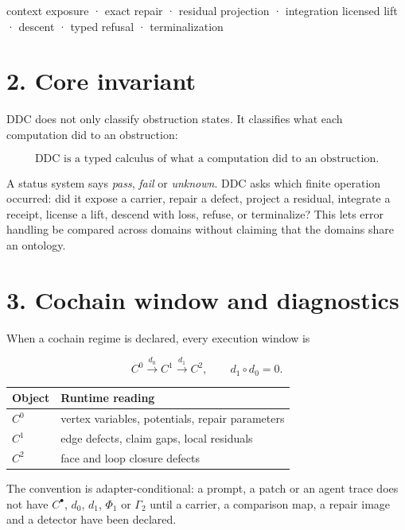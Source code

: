 \documentclass[
  11pt,
]{article}
\newenvironment{Shaded}{}{}
\newcommand{\NormalTok}[1]{#1}
\renewcommand{\_}{\ddcunderscore\allowbreak}
\begin{document}
\begin{Shaded}
\begin{Highlighting}[]
\NormalTok{context exposure · exact repair · residual projection · integration}
\NormalTok{licensed lift · descent · typed refusal · terminalization}
\end{Highlighting}
\end{Shaded}

\section{2. Core invariant}\label{core-invariant}

DDC does not only classify obstruction states. It classifies what each
computation did to an obstruction:

\[\boxed{\text{DDC is a typed calculus of what a computation did to an obstruction.}}\]

A status system says \emph{pass}, \emph{fail} or \emph{unknown}. DDC
asks which finite operation occurred: did it expose a carrier, repair a
defect, project a residual, integrate a receipt, license a lift, descend
with loss, refuse, or terminalize? This lets error handling be compared
across domains without claiming that the domains share an ontology.

\section{3. Cochain window and
diagnostics}\label{cochain-window-and-diagnostics}

When a cochain regime is declared, every execution window is

\[C^0 \xrightarrow{d_0} C^1 \xrightarrow{d_1} C^2, \qquad d_1 \circ d_0 = 0.\]

\begin{longtable}[]{@{}ll@{}}
\toprule\noalign{}
Object & Runtime reading \\
\midrule\noalign{}
\endhead
\bottomrule\noalign{}
\endlastfoot
\(C^0\) & vertex variables, potentials, repair parameters \\
\(C^1\) & edge defects, claim gaps, local residuals \\
\(C^2\) & face and loop closure defects \\
\end{longtable}

The convention is adapter-conditional: a prompt, a patch or an agent
trace does not have \(C^\bullet\), \(d_0\), \(d_1\), \(\Phi_1\) or
\(\Gamma_2\) until a carrier, a comparison map, a repair image and a
detector have been declared.
\end{document}
